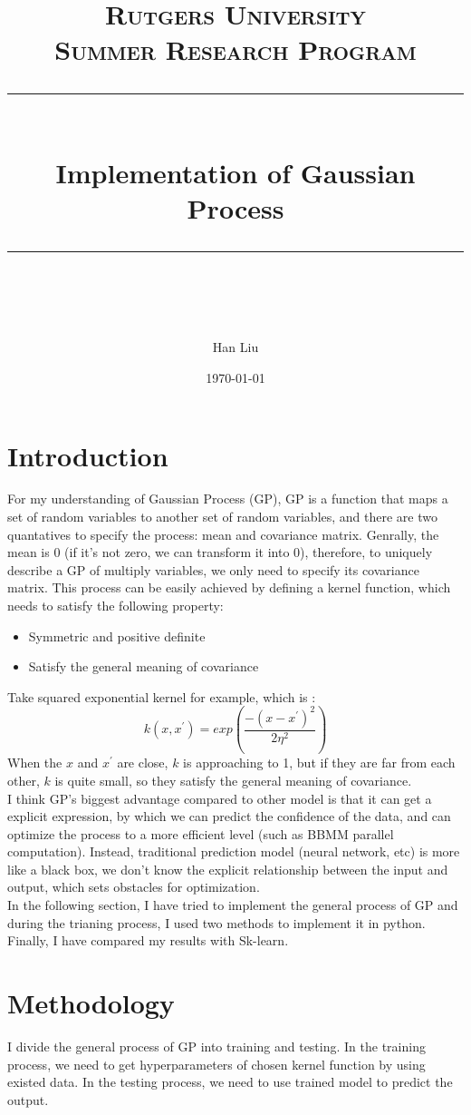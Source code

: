 \documentclass{article} %
\title{
\normalfont \normalsize 
\textsc{Rutgers University \\ 
Summer Research Program} \\
[10pt] 
\rule{\linewidth}{0.5pt} \\[6pt] 
\huge Implementation of Gaussian Process  \\
\rule{\linewidth}{2pt}  \\[10pt]
}
\author{Han Liu}
\date{\normalsize \today}
\newcounter{other}
\begin{document}
\maketitle



\section{Introduction}
For my understanding of Gaussian Process (GP), GP is a function that maps a set of random variables to another set of random variables, and there are two quantatives to specify the process: mean and covariance matrix. Genrally, the mean is 0 (if it's not zero, we can transform it into 0), therefore, to uniquely describe a GP of multiply variables, we only need to specify its covariance matrix. This process can be easily achieved by defining a kernel function, which needs to satisfy the following property:
\begin{itemize}
	\item Symmetric and positive definite
	\item Satisfy the general meaning of covariance 
\end{itemize}
Take squared exponential kernel for example, which is :
\begin{equation}\label{eq1}
k(x,x^{'})=exp(\frac{-(x-x^{'})^2}{2\eta^2})
\end{equation}
When the $x$ and $x^{'}$ are close, $k$ is approaching to 1, but if they are far from each other, $k$ is quite small, so they satisfy the general meaning of covariance.\\

I think GP's biggest advantage compared to other model is that it can get a explicit expression, by which we can predict the confidence of the data, and can optimize the process to a more efficient level (such as BBMM parallel computation). Instead, traditional prediction model (neural network, etc) is more like a black box, we don't know the explicit relationship between the input and output, which sets obstacles for optimization.\\

In the following section, I have tried to implement the general process of GP and during the trianing process, I used two methods to implement it in python. Finally, I have compared my results with Sk-learn. 


\section{Methodology}
I divide the general process of GP into training and testing. In the training process, we need to get hyperparameters of chosen kernel function by using existed data. In the testing process, we need to use trained model to predict the output.
\end{document}
